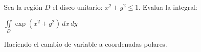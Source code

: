 \noindent Sea la región $D$ el disco unitario: $x^2+y^2 \leq 1$. Evalua la integral:

\begin{center}
    $\displaystyle\iint\limits_D \exp(x^2 + y^2) \, dx \, dy$
\end{center}

\noindent Haciendo el cambio de variable a coordenadas polares.
